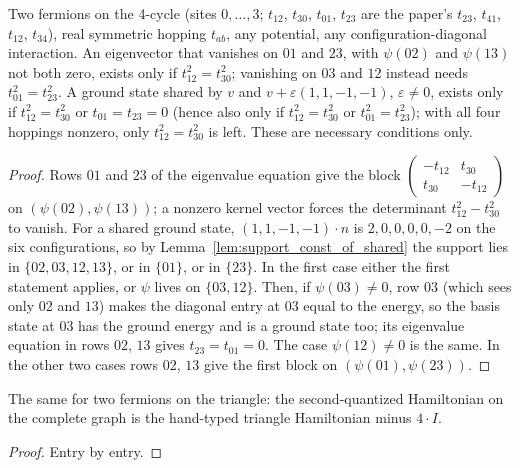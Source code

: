 \begin{theorem}
  \label{thm:square_hopping_symmetry}
  \leanok
  Two fermions on the 4-cycle (sites $0,\dots,3$; $t_{12}$, $t_{30}$, $t_{01}$, $t_{23}$ are the paper's $t_{23}$,
  $t_{41}$, $t_{12}$, $t_{34}$), real symmetric hopping $t_{ab}$, any potential, any configuration-diagonal interaction.
  An eigenvector that vanishes on $01$ and $23$, with $\psi(02)$ and $\psi(13)$ not both zero, exists only if
  $t_{12}^2=t_{30}^2$; vanishing on $03$ and $12$ instead needs $t_{01}^2=t_{23}^2$. A ground state shared by $v$ and
  $v+\varepsilon(1,1,-1,-1)$, $\varepsilon\ne0$, exists only if $t_{12}^2=t_{30}^2$ or $t_{01}=t_{23}=0$ (hence also
  only if $t_{12}^2=t_{30}^2$ or $t_{01}^2=t_{23}^2$); with all four hoppings nonzero, only $t_{12}^2=t_{30}^2$ is left.
  These are necessary conditions only.
\end{theorem}
\begin{proof}
  \leanok
  Rows $01$ and $23$ of the eigenvalue equation give the block $\begin{pmatrix}-t_{12}&t_{30}\\t_{30}&-t_{12}\end{pmatrix}$
  on $(\psi(02),\psi(13))$; a nonzero kernel vector forces the determinant $t_{12}^2-t_{30}^2$ to vanish. For a shared
  ground state, $(1,1,-1,-1)\cdot n$ is $2,0,0,0,0,-2$ on the six configurations, so by
  Lemma~\ref{lem:support_const_of_shared} the support lies in $\{02,03,12,13\}$, or in $\{01\}$, or in $\{23\}$. In the first case
  either the first statement applies, or $\psi$ lives on $\{03,12\}$. Then, if $\psi(03)\ne0$, row $03$ (which sees
  only $02$ and $13$) makes the diagonal entry at $03$ equal to the energy, so the basis state at $03$ has the ground
  energy and is a ground state too; its eigenvalue equation in rows $02$, $13$ gives $t_{23}=t_{01}=0$. The case
  $\psi(12)\ne0$ is the same. In the other two cases rows $02$, $13$ give the first block on $(\psi(01),\psi(23))$.
\end{proof}

\begin{theorem}
  \label{thm:bridge_triangle}
  \leanok
  The same for two fermions on the triangle: the second-quantized Hamiltonian on the complete graph is the
  hand-typed triangle Hamiltonian minus $4\cdot I$.
\end{theorem}
\begin{proof}
  \leanok
  Entry by entry.
\end{proof}
